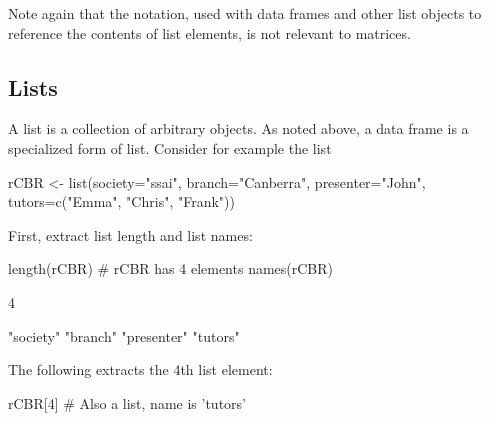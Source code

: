 Note again that the \code{\$} notation, used with data frames
  and other list objects to reference the contents of list elements, is
  not relevant to matrices.

\subsection{Lists}\label{sec:df-lists}

A list  is a collection of arbitrary
objects. As noted above, a data frame is a specialized form of
list. Consider for example the list
\begin{Schunk}
\begin{Sinput}
rCBR <- list(society="ssai", branch="Canberra",
             presenter="John",
             tutors=c("Emma", "Chris", "Frank"))
\end{Sinput}
\end{Schunk}

First, extract list length and list names:
\begin{Schunk}
\begin{Sinput}
length(rCBR)      # rCBR has 4 elements
names(rCBR)
\end{Sinput}
\end{Schunk}

\begin{Schunk}
\begin{Soutput}
[1] 4
\end{Soutput}
\begin{Soutput}
[1] "society"   "branch"    "presenter" "tutors"   
\end{Soutput}
\end{Schunk}

The following extracts the 4th list element:
\begin{Schunk}
\begin{Sinput}
rCBR[4]           # Also a list,  name is 'tutors'
\end{Sinput}
\end{Schunk}

